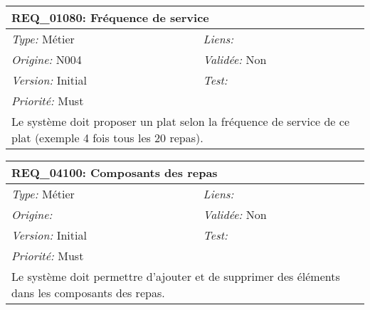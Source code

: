 \begin{table}[!h]

\begin{tabular}{|p{60mm}p{100mm}|}

\hline

\multicolumn{2}{|l|}{\textbf{REQ\_01080:} Fréquence de service} \\ \hline

\emph{Type:} Métier & \emph{Liens:}  \\

\emph{Origine:} N004 & \emph{Validée:} Non \\

\emph{Version:} Initial & \emph{Test:}  \\

\emph{Priorité:} Must & \\ \hline

\multicolumn{2}{|p{16cm}|}{Le système doit proposer un plat selon la fréquence de service de ce plat (exemple 4 fois tous les 20 repas).} \\ \hline

\end{tabular}

\end{table}



\begin{table}[!h]

\begin{tabular}{|p{60mm}p{100mm}|}

\hline

\multicolumn{2}{|l|}{\textbf{REQ\_04100:} Composants des repas} \\ \hline

\emph{Type:} Métier & \emph{Liens:}  \\

\emph{Origine:}  & \emph{Validée:} Non \\

\emph{Version:} Initial & \emph{Test:}  \\

\emph{Priorité:} Must & \\ \hline

\multicolumn{2}{|p{16cm}|}{Le système doit permettre d'ajouter et de supprimer des éléments dans les composants des repas.} \\ \hline

\end{tabular}

\end{table}



